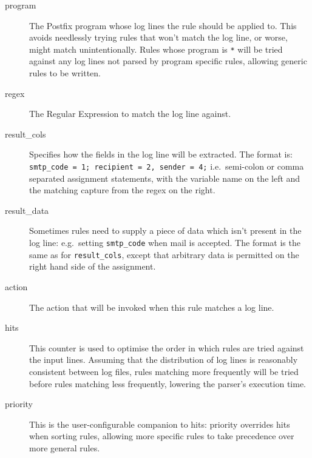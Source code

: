 \documentclass[draft]{svmult}
\newcommand{\tab}[0]{%
    \hspace*{2em}%
}
\begin{document}
\begin{description}

    \item [program] The Postfix program whose log lines the rule should be
        applied to.  This avoids needlessly trying rules that won't match
        the log line, or worse, might match unintentionally.  Rules whose
        program is \texttt{*} will be tried against any log lines not
        parsed by program specific rules, allowing generic rules to be
        written.

    \item [regex] The Regular Expression to match the log line against.

    \item [result\_cols] Specifies how the fields in the log line will be
        extracted.  The format is:
        \tab{} \texttt{smtp\_code = 1; recipient = 2, sender = 4;} \newline
        i.e.\ semi-colon or comma separated assignment statements, with the
        variable name on the left and the matching capture from the regex
        on the right.

    \item [result\_data] Sometimes rules need to supply a piece of data
        which isn't present in the log line: e.g.\ setting
        \texttt{smtp\_code} when mail is accepted.  The format is the same
        as for \texttt{result\_cols}, except that arbitrary data is
        permitted on the right hand side of the assignment.

    \item [action] The action that will be invoked when this rule matches a
        log line.

    \item [hits] This counter is used to optimise the order in which rules
        are tried against the input lines.  Assuming that the distribution
        of log lines is reasonably consistent between log files, rules
        matching more frequently will be tried before rules matching less
        frequently, lowering the parser's execution time.

    \item [priority] This is the user-configurable companion to hits:
        priority overrides hits when sorting rules, allowing more
        specific rules to take precedence over more general rules.

\end{description}
\end{document}
